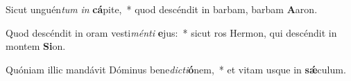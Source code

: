 \item Sicut unguén\textit{tum} \textit{in} \textbf{cá}pite,~* quod descéndit in barbam, barbam \textbf{A}aron.
\item Quod descéndit in oram vesti\textit{mén}\textit{ti} \textbf{e}jus:~* sicut ros Hermon, qui descéndit in montem \textbf{Si}on.
\item Quóniam illic mandávit Dóminus bene\textit{dic}\textit{ti}\textbf{ó}nem,~* et vitam usque in \textbf{sǽ}culum.
